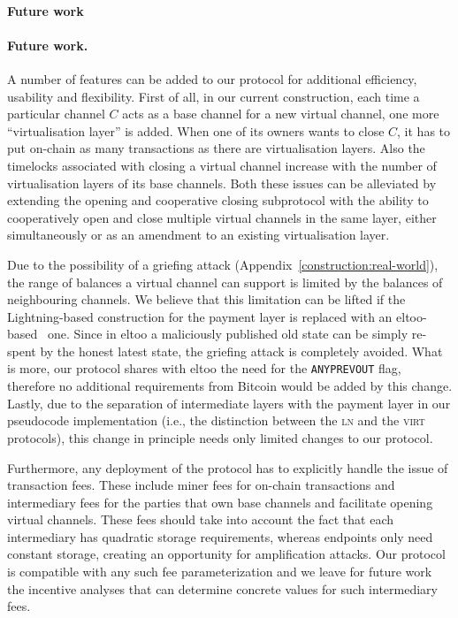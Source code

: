 \makeatletter%
%
  {\paragraph{Future work}}%
  {\paragraph{Future work.}}%
\makeatother%
  A number of features can be added to our protocol for additional efficiency,
  usability and flexibility. First of all, in our current construction, each
  time a particular channel $C$ acts as a base
  channel for a new virtual channel, one more ``virtualisation layer'' is added. When
  one of its owners wants to close $C$, it has to put on-chain as many
  transactions as there are virtualisation layers. Also the timelocks associated
  with closing a virtual channel increase with the number of virtualisation
  layers of its base channels. Both these issues can be alleviated by extending
  the opening and cooperative closing subprotocol with the ability to
  cooperatively open and close multiple virtual channels in the same layer,
  either simultaneously or as an amendment to an existing virtualisation layer.

  Due to the possibility of a griefing attack
  (Appendix~\ref{construction:real-world}), the range of balances a virtual
  channel can
  support is limited by the balances of neighbouring channels. We believe that
  this limitation can be lifted if the Lightning-based
  construction for the payment layer is replaced with an
  eltoo-based~\cite{eltoo} one. Since in eltoo a maliciously published
  old state can be simply re-spent by the honest latest state, the griefing
  attack is completely avoided. What is more, our protocol shares with eltoo the
  need for the \texttt{ANYPREVOUT} flag, therefore no additional
  requirements from Bitcoin would be added by this change. Lastly,
  due to the separation of intermediate layers with the payment layer in our
  pseudocode implementation (i.e., the distinction
  between the \textsc{ln} and the \textsc{virt} protocols), this change
  in principle needs only limited changes to our protocol.

  Furthermore, any deployment of the protocol has to explicitly handle the issue
  of transaction fees. These include miner fees for on-chain transactions and
  intermediary fees for the parties that own base channels and facilitate
  opening virtual channels. These fees should take into account the fact that
  each intermediary has quadratic storage requirements, whereas endpoints only
  need constant storage, creating an opportunity for amplification attacks. Our
  protocol is compatible with any such fee parameterization and we leave for
  future work the incentive analyses that can determine concrete values for such
  intermediary fees.

